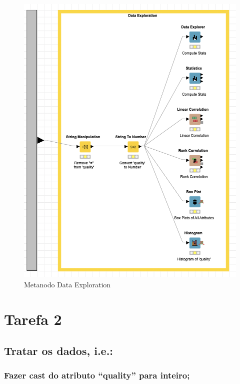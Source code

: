 \documentclass{article}
\begin{document}
\begin{figure}[H]
    \centering
    \includegraphics[scale=0.6]{Images/T1.png}
    \caption{Metanodo Data Exploration}
\end{figure}

\clearpage

\section{Tarefa 2}

\subsection{Tratar os dados, i.e.:}

\subsubsection{Fazer cast do atributo “quality” para inteiro;}
\end{document}
